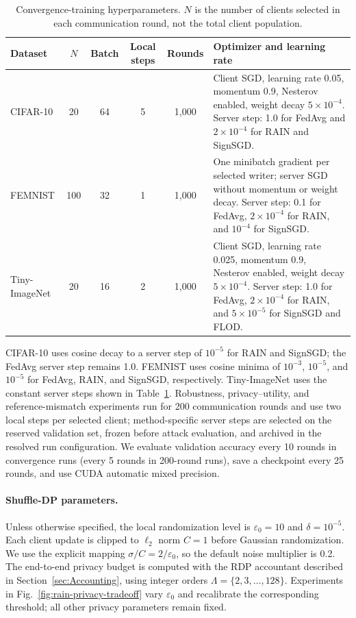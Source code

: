 \begin{table}[t]
  \centering
  \small
  \begin{tabular}{lccccp{4.8cm}}
    \toprule
    Dataset & $N$ & Batch & Local steps & Rounds & Optimizer and learning rate \\
    \midrule
    CIFAR-10 & 20 & 64 & 5 & 1,000 & Client SGD, learning rate 0.05,
    momentum 0.9, Nesterov enabled, weight decay $5\times10^{-4}$.
    Server step: 1.0 for FedAvg and $2\times10^{-4}$ for RAIN and SignSGD. \\
    FEMNIST & 100 & 32 & 1 & 1,000 & One minibatch gradient per selected
    writer; server SGD without momentum or weight decay. Server step: 0.1 for
    FedAvg, $2\times10^{-4}$ for RAIN, and $10^{-4}$ for SignSGD. \\
    Tiny-ImageNet & 20 & 16 & 2 & 1,000 & Client SGD, learning rate 0.025,
    momentum 0.9, Nesterov enabled, weight decay $5\times10^{-4}$.
    Server step: 1.0 for FedAvg, $2\times10^{-4}$ for RAIN, and
    $5\times10^{-5}$ for SignSGD and FLOD. \\
    \bottomrule
  \end{tabular}
  \caption{Convergence-training hyperparameters. $N$ is the number of clients
  selected in each communication round, not the total client population.}
  \label{tab:app-training-config}
\end{table}

CIFAR-10 uses cosine decay to a server step of $10^{-5}$ for RAIN and SignSGD;
the FedAvg server step remains 1.0. FEMNIST uses cosine minima of $10^{-3}$,
$10^{-5}$, and $10^{-5}$ for FedAvg, RAIN, and SignSGD, respectively.
Tiny-ImageNet uses the constant server steps shown in
Table~\ref{tab:app-training-config}. Robustness, privacy--utility, and
reference-mismatch experiments run for 200 communication rounds and use two
local steps per selected client; method-specific server steps are selected on
the reserved validation set, frozen before attack evaluation, and archived in
the resolved run configuration. We evaluate validation accuracy every 10
rounds in convergence runs (every 5 rounds in 200-round runs), save a
checkpoint every 25 rounds, and use CUDA automatic mixed precision.

\paragraph{Shuffle-DP parameters.}
Unless otherwise specified, the local randomization level is
$\varepsilon_0=10$ and $\delta=10^{-5}$. Each client update is clipped to
$\ell_2$ norm $C=1$ before Gaussian randomization. We use the explicit mapping
$\sigma/C=2/\varepsilon_0$, so the default noise multiplier is 0.2. The
end-to-end privacy budget is computed with the RDP accountant described in
Section~\ref{sec:Accounting}, using integer orders
$\Lambda=\{2,3,\ldots,128\}$. Experiments in
Fig.~\ref{fig:rain-privacy-tradeoff} vary $\varepsilon_0$ and recalibrate the
corresponding threshold; all other privacy parameters remain fixed.

